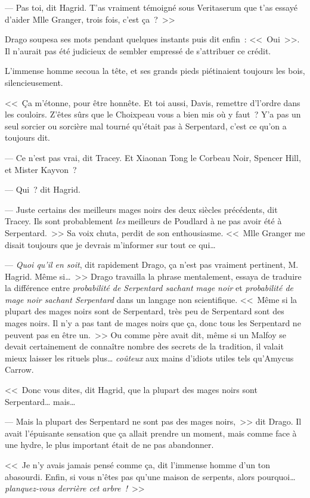--- Pas toi, dit Hagrid. T'as vraiment témoigné sous Veritaserum que t'as essayé d'aider Mlle Granger, trois fois, c'est ça~?~>>

Drago soupesa ses mots pendant quelques instants puis dit enfin~: <<~Oui~>>. Il n'aurait pas été judicieux de sembler empressé de s'attribuer ce crédit.

L'immense homme secoua la tête, et ses grands pieds piétinaient toujours les bois, silencieusement.

<<~Ça m'étonne, pour être honnête. Et toi aussi, Davis, remettre d'l'ordre dans les couloirs. Z'êtes sûrs que le Choixpeau vous a bien mis où y faut~? Y'a pas un seul sorcier ou sorcière mal tourné qu'était pas à Serpentard, c'est ce qu'on a toujours dit.

--- Ce n'est pas vrai, dit Tracey. Et Xiaonan Tong le Corbeau Noir, Spencer Hill, et Mister Kayvon~?

--- Qui~? dit Hagrid.

--- Juste certains des meilleurs mages noirs des deux siècles précédents, dit Tracey. Ils sont probablement \emph{les} meilleurs de Poudlard à ne pas avoir été à Serpentard.~>> Sa voix chuta, perdit de son enthousiasme. <<~Mlle Granger me disait toujours que je devrais m'informer sur tout ce qui…

--- \emph{Quoi qu'il en soit}, dit rapidement Drago, ça n'est pas vraiment pertinent, M. Hagrid. Même si…~>> Drago travailla la phrase mentalement, essaya de traduire la différence entre \emph{probabilité de Serpentard sachant mage noir} et \emph{probabilité de mage noir sachant Serpentard} dans un langage non scientifique. <<~Même si la plupart des mages noirs sont de Serpentard, très peu de Serpentard sont des mages noirs. Il n'y a pas tant de mages noirs que ça, donc tous les Serpentard ne peuvent pas en être un.~>> Ou comme père avait dit, même si un Malfoy se devait certainement de connaître nombre des secrets de la tradition, il valait mieux laisser les rituels plus… \emph{coûteux} aux mains d'idiots utiles tels qu'Amycus Carrow.

<<~Donc vous dites, dit Hagrid, que la plupart des mages noirs sont Serpentard… mais…

--- Mais la plupart des Serpentard ne sont pas des mages noirs,~>> dit Drago. Il avait l'épuisante sensation que ça allait prendre un moment, mais comme face à une hydre, le plus important était de ne pas abandonner.

<<~Je n'y avais jamais pensé comme ça, dit l'immense homme d'un ton abasourdi. Enfin, si vous n'êtes pas qu'une maison de serpents, alors pourquoi… \emph{planquez-vous derrière cet arbre~!}~>>

